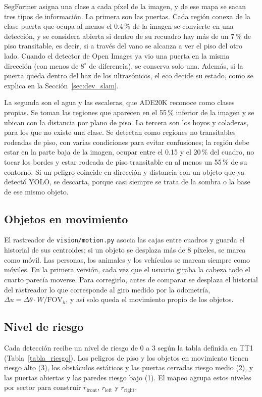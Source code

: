 SegFormer asigna una clase a cada píxel de la imagen, y de ese mapa se sacan tres tipos
de información. La primera son las puertas. Cada región conexa de la clase puerta que
ocupa al menos el 0.4\,\% de la imagen se convierte en una detección, y se considera
abierta si dentro de su recuadro hay más de un 7\,\% de piso transitable, es decir, si a
través del vano se alcanza a ver el piso del otro lado. Cuando el detector de Open
Images ya vio una puerta en la misma dirección (con menos de $8^\circ$ de diferencia),
se conserva solo una. Además, si la puerta queda dentro del haz de los ultrasónicos, el
eco decide su estado, como se explica en la Sección~\ref{sec:dev_slam}.

La segunda son el agua y las escaleras, que ADE20K reconoce como clases propias. Se
toman las regiones que aparecen en el 55\,\% inferior de la imagen y se ubican con la
distancia por plano de piso. La tercera son los hoyos y coladeras, para los que no
existe una clase. Se detectan como regiones no transitables rodeadas de piso, con
varias condiciones para evitar confusiones; la región debe estar en la parte baja de la
imagen, ocupar entre el 0.15 y el 20\,\% del cuadro, no tocar los bordes y estar rodeada
de piso transitable en al menos un 55\,\% de su contorno. Si un peligro coincide en
dirección y distancia con un objeto que ya detectó YOLO, se descarta, porque casi
siempre se trata de la sombra o la base de ese mismo objeto.

\subsection{Objetos en movimiento}

El rastreador de \texttt{vision/motion.py} asocia las cajas entre cuadros y guarda el
historial de sus centroides; si un objeto se desplaza más de 8 píxeles, se marca como
móvil. Las personas, los animales y los vehículos se marcan siempre como móviles. En la
primera versión, cada vez que el usuario giraba la cabeza todo el cuarto parecía
moverse. Para corregirlo, antes de comparar se desplaza el historial del rastreador lo
que corresponde al giro medido por la odometría, $\Delta u = \Delta\theta \cdot W /
\text{FOV}_h$, y así solo queda el movimiento propio de los objetos.

\subsection{Nivel de riesgo}

Cada detección recibe un nivel de riesgo de 0 a 3 según la tabla definida en TT1
(Tabla~\ref{tabla_riesgo}). Los peligros de piso y los objetos en movimiento tienen
riesgo alto (3), los obstáculos estáticos y las puertas cerradas riesgo medio (2), y las
puertas abiertas y las paredes riesgo bajo (1). El mapeo agrupa estos niveles por sector
para construir $r_{\text{front}}$, $r_{\text{left}}$ y $r_{\text{right}}$.

